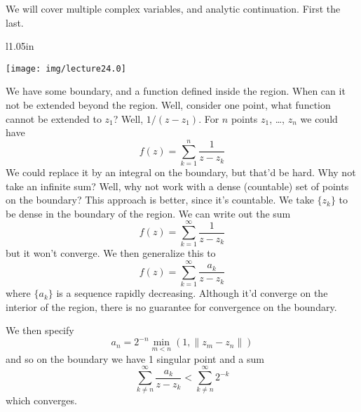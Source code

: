 We will cover multiple complex variables, and analytic
continuation. First the last.

\begin{wrapfigure}{l}{1.05in}
\vspace{-20pt}
\begin{center}
\texttt{[image: img/lecture24.0]}
\end{center}
\vspace{-20pt}
\end{wrapfigure}
We have some boundary, and a function defined inside the
region. When can it not be extended beyond the region. Well,
consider one point, what function cannot be extended to $z_{1}$?
Well, $1/(z-z_{1})$. For $n$ points $z_{1}$, \dots, $z_{n}$ we
could have
\begin{equation}
f(z)=\sum_{k=1}^{n}\frac{1}{z-z_{k}}
\end{equation}
We could replace it by an integral on the boundary, but that'd be
hard. Why not take an infinite sum? Well, why not work with a
dense (countable) set of points on the boundary? This approach is
better, since it's countable. We take $\{z_{k}\}$ to be dense in
the boundary of the region. We can write out the sum
\begin{equation}
f(z)=\sum^{\infty}_{k=1}\frac{1}{z-z_{k}}
\end{equation}
but it won't converge. We then generalize this to
\begin{equation}
f(z)=\sum^{\infty}_{k=1}\frac{a_{k}}{z-z_{k}}
\end{equation}
where $\{a_{k}\}$ is a sequence rapidly decreasing. Although it'd
converge on the interior of the region, there is no guarantee for
convergence on the boundary.

We then specify
\begin{equation}
a_{n}=2^{-n}\min_{m<n}(1,\|z_{m}-z_{n}\|)
\end{equation}
and so on the boundary we have 1 singular point and a sum
\begin{equation}
\sum^{\infty}_{k\not=n}\frac{a_{k}}{z-z_{k}}<\sum^{\infty}_{k\not=n}2^{-k}
\end{equation}
which converges.
